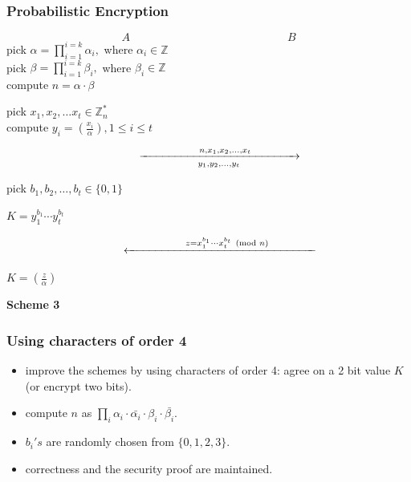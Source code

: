 \documentclass{beamer}
\begin{document}
\begin{frame}
\frametitle{Probabilistic Encryption}

\small{

\begin{equation*}
		A \qquad  \qquad \qquad \qquad \qquad \qquad \qquad B
		\end{equation*}
			pick $\alpha = \prod_{i=1}^{i=k} \alpha_i,$ where $\alpha_i \in \mathbb{Z}$ \\
			pick $\beta = \prod_{i=1}^{i=k} \beta_i,$ where $\beta_i \in \mathbb{Z}$ \\
			compute $n = \alpha \cdot \beta $
			
		\bigskip		
				
		\noindent 
		pick $x_1, x_2, \ldots x_t \in \mathbb{Z}_n^*$ \\
		compute $y_i = (\frac{x_i}{\alpha}), 1 \leq i \leq t$
				 
		\begin{equation*}
		\qquad \xrightarrow[y_1,y_2, \ldots, y_t]{\hspace*{1.8cm} n,x_1,x_2,\ldots,x_t \qquad \qquad}  
		\end{equation*}
				
 
				
		\hspace{80mm} pick $b_1, b_2, \ldots, b_t \in \{ 0,1\}$ 
				
		\hspace{80mm} $K = y_1^{b_1} \cdots y_t^{b_t}$ 			

				
						

		\begin{equation*}
		\qquad \xleftarrow{\hspace*{1.8cm} z= x_1^{b_1} \cdots x_t^{b_t} \pmod{n}  \qquad \qquad}  
		\end{equation*}   
				
		$K = (\frac{z}{\alpha})$ 
		
		\begin{center}
		\textbf{Scheme 3}
		\end{center}
	}	

\end{frame}


\begin{frame}
\frametitle{Using characters of order 4}

	\begin{itemize}
		\item improve the schemes by using characters of order 4: agree on a 2 bit value $K$ (or encrypt two bits).
		\item compute $n$ as $ \prod_i \alpha_i \cdot \bar{\alpha_i} \cdot \beta_i \cdot \bar{\beta_i}$.
		\item $b_i's$ are randomly chosen from $\{ 0,1,2,3\}$.
		\item correctness and the security proof are maintained. 	
	\end{itemize}
\end{frame}
\end{document}
